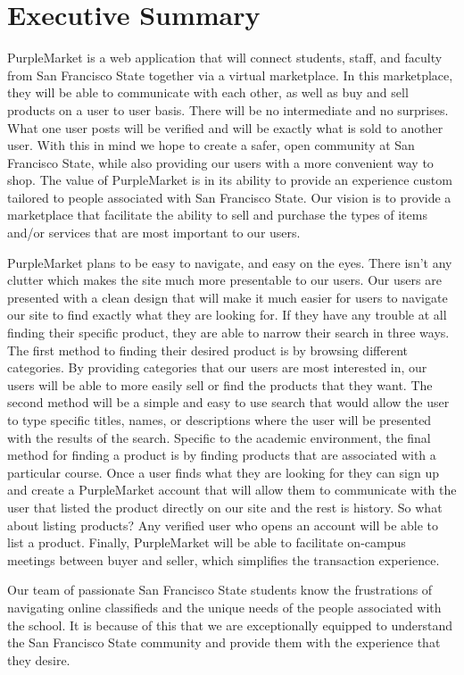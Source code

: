 \section{Executive Summary}

PurpleMarket is a web application that will connect students, staff, and faculty from San Francisco State together via a virtual marketplace. In this marketplace, they will be able to communicate with each other, as well as buy and sell products on a user to user basis. There will be no intermediate and no surprises. What one user posts will be verified and will be exactly what is sold to another user. With this in mind we hope to create a safer, open community at San Francisco State, while also providing our users with a more convenient way to shop. The value of PurpleMarket is in its ability to provide an experience custom tailored to people associated with San Francisco State. Our vision is to provide a marketplace that facilitate the ability to sell and purchase the types of items and/or services that are most important to our users. 

PurpleMarket plans to be easy to navigate, and easy on the eyes. There isn’t any clutter which makes the site much more presentable to our users. Our users are presented with a clean design that will make it much easier for users to navigate our site to find exactly what they are looking for. If they have any trouble at all finding their specific product, they are able to narrow their search in three ways. The first method to finding their desired product is by browsing different categories. By providing categories that our users are most interested in, our users will be able to more easily sell or find the products that they want. The second method will be a simple and easy to use search that would allow the user to type specific titles, names, or descriptions where the user will be presented with the results of the search. Specific to the academic environment, the final method for finding a product is by finding products that are associated with a particular course.  Once a user finds what they are looking for they can sign up and create a PurpleMarket account that will allow them to communicate with the user that listed the product directly on our site and the rest is history. So what about listing products?  Any verified user who opens an account will be able to list a product. Finally, PurpleMarket will be able to facilitate on-campus meetings between buyer and seller, which simplifies the transaction experience.

Our team of passionate San Francisco State students know the frustrations of navigating online classifieds and the unique needs of the people associated with the school.  It is because of this that we are exceptionally equipped to understand the San Francisco State community and provide them with the experience that they desire.